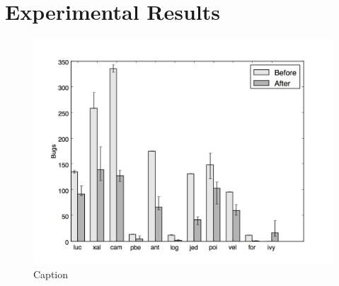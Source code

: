\documentclass[conference]{IEEEtran}
\begin{document}
\section{Experimental Results}
\begin{figure}[!t]
\centering
\includegraphics[width=\linewidth]{_figs/Histogram}
\caption{Caption}
\label{fig:bugs}
\end{figure}
\end{document}
